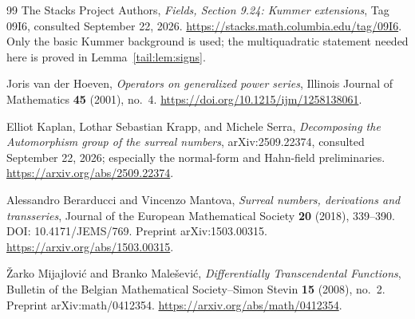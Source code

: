 \documentclass[11pt,a4paper]{article}
\numberwithin{equation}{section}
\theoremstyle{definition}
\theoremstyle{remark}
\begin{document}
\begin{thebibliography}{99}
The Stacks Project Authors, \emph{Fields, Section 9.24: Kummer extensions},
Tag 09I6, consulted September 22, 2026.
\url{https://stacks.math.columbia.edu/tag/09I6}.
Only the basic Kummer background is used; the multiquadratic statement
needed here is proved in Lemma~\ref{tail:lem:signs}.

Joris van der Hoeven, \emph{Operators on generalized power series},
Illinois Journal of Mathematics \textbf{45} (2001), no.~4.
\url{https://doi.org/10.1215/ijm/1258138061}.

Elliot Kaplan, Lothar Sebastian Krapp, and Michele Serra,
\emph{Decomposing the Automorphism group of the surreal numbers},
arXiv:2509.22374, consulted September 22, 2026; especially the
normal-form and Hahn-field preliminaries.
\url{https://arxiv.org/abs/2509.22374}.

Alessandro Berarducci and Vincenzo Mantova,
\emph{Surreal numbers, derivations and transseries},
Journal of the European Mathematical Society \textbf{20} (2018),
339--390. DOI: 10.4171/JEMS/769. Preprint arXiv:1503.00315.
\url{https://arxiv.org/abs/1503.00315}.

\v Zarko Mijajlovi\'c and Branko Male\v sevi\'c,
\emph{Differentially Transcendental Functions},
Bulletin of the Belgian Mathematical Society--Simon Stevin
\textbf{15} (2008), no.~2. Preprint arXiv:math/0412354.
\url{https://arxiv.org/abs/math/0412354}.
\end{thebibliography}
\end{document}
